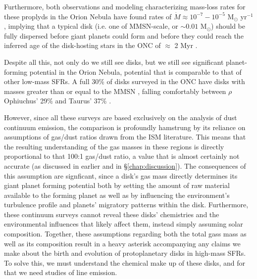 Furthermore, both observations \citep{HenneyODell1999} and modeling \citep{Haworth2016} characterizing mass-loss rates for these proplyds in the Orion Nebula have found rates of $\dot{M} \approx 10^{-7}-10^{-5}$ M$_{\odot}$ yr$^{-1}$, implying that a typical disk (i.e. one of MMSN-scale, or $\sim0.01$ M$_{\odot}$) should be fully dispersed before giant planets could form \citep{Hubickyj2005} and before they could reach the inferred age of the disk-hosting stars in the ONC of $\approx$ 2 Myr \citep{Reggiani2011}.


  
Despite all this, not only do we still see disks, but we still see significant planet-forming potential in the Orion Nebula, potential that is comparable to that of other low-mass SFRs. A full 30\% of disks surveyed in the ONC have disks with masses greater than or equal to the MMSN \citep{Mann2014}, falling comfortably between $\rho$ Ophiuchus' 29\% \cite{AndrewsWilliams2005} and Taurus' 37\% \citep{AndrewsWilliams2007}.


However, since all these surveys are based exclusively on the analysis of dust continuum emission, the comparison is profoundly hamstrung by its reliance on assumptions of gas/dust ratios drawn from the ISM literature. This means that the resulting understanding of the gas masses in these regions is directly proportional to that 100:1 gas/dust ratio, a value that is almost certainly not accurate (as discussed in earlier and in \S\ref{chap:discussion}). The consequences of this assumption are signficant, since a disk's gas mass directly determines its giant planet forming potential both by setting the amount of raw material available to the forming planet as well as by influencing the environment's turbulence profile and planets' migratory patterns within the disk. Furthermore, these continuum surveys cannot reveal these disks' chemistries and the environmental influences that likely affect them, instead simply assuming solar composition. Together, these assumptions regarding both the total gass mass as well as its composition result in a heavy asterisk accompanying any claims we make about the birth and evolution of protoplanetary disks in high-mass SFRs. To solve this, we must understand the chemical make up of these disks, and for that we need studies of line emission.




